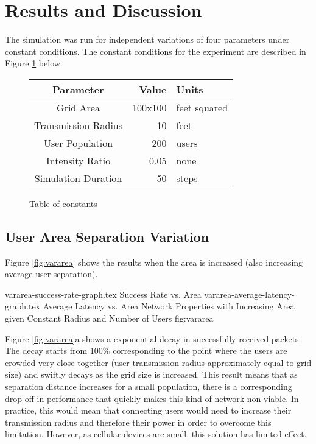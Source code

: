 \section{Results and Discussion}
The simulation was run for independent variations of four parameters under constant conditions.
The constant conditions for the experiment are described in Figure \ref{fig:consttable} below.

\begin{figure}[!htb]
    \centering
    \begin{tabular}{c|rl}
        \hline
        Parameter               & Value     & Units         \\
        \hline
        Grid Area               & 100x100   & feet squared  \\
        Transmission Radius     & 10        & feet          \\
        User Population         & 200       & users         \\
        \hline
        Intensity Ratio         & 0.05      & none          \\
        Simulation Duration     & 50        & steps         \\
        \hline
    \end{tabular}
    \caption{Table of constants}
    \label{fig:consttable}
\end{figure}

\subsection{User Area Separation Variation}
Figure \ref{fig:vararea} shows the results when the area is increased
(also increasing average user separation).

\sidebysidefigures
{vararea-success-rate-graph.tex}       {Success Rate vs. Area}
{vararea-average-latency-graph.tex}    {Average Latency vs. Area}
{Network Properties with Increasing Area given Constant Radius and Number of Users}
{fig:vararea}

Figure \ref{fig:vararea}a shows a exponential decay in successfully received packets.
The decay starts from 100\% corresponding to the point where the users are crowded very close
together (user transmission radius approximately equal to grid size) and swiftly decays as
the grid size is increased.
This result means that as separation distance increases for a small population, there
is a corresponding drop-off in performance that quickly makes this kind of network non-viable.
In practice, this would mean that connecting users would need to increase their transmission radius
and therefore their power in order to overcome this limitation.
However, as cellular devices are small, this solution has limited effect.

